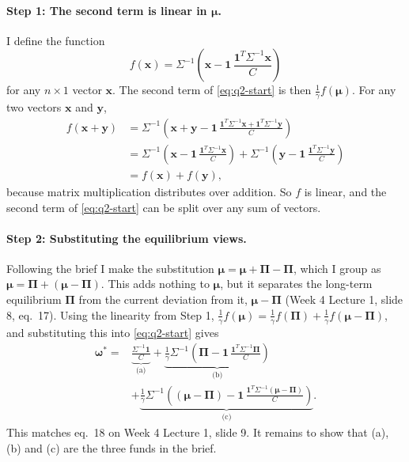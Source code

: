 \documentclass[11pt]{article}
\numberwithin{equation}{section}
\begin{document}
\paragraph{Step 1: The second term is linear in $\bm{\mu}$.}
I define the function
\begin{equation}
  f(\mathbf{x}) = \Sigma^{-1}\left(\mathbf{x} - \mathbf{1}\,\frac{\mathbf{1}^{T}\Sigma^{-1}\mathbf{x}}{C}\right)
  \label{eq:q2-f}
\end{equation}
for any $n \times 1$ vector $\mathbf{x}$. The second term of \eqref{eq:q2-start} is then $\frac{1}{\gamma} f(\bm{\mu})$. For any two vectors $\mathbf{x}$ and $\mathbf{y}$,
\begin{align*}
  f(\mathbf{x} + \mathbf{y})
  &= \Sigma^{-1}\left(\mathbf{x} + \mathbf{y} - \mathbf{1}\,\frac{\mathbf{1}^{T}\Sigma^{-1}\mathbf{x} + \mathbf{1}^{T}\Sigma^{-1}\mathbf{y}}{C}\right) \\
  &= \Sigma^{-1}\left(\mathbf{x} - \mathbf{1}\,\frac{\mathbf{1}^{T}\Sigma^{-1}\mathbf{x}}{C}\right) + \Sigma^{-1}\left(\mathbf{y} - \mathbf{1}\,\frac{\mathbf{1}^{T}\Sigma^{-1}\mathbf{y}}{C}\right) \\
  &= f(\mathbf{x}) + f(\mathbf{y}),
\end{align*}
because matrix multiplication distributes over addition. So $f$ is linear, and the second term of \eqref{eq:q2-start} can be split over any sum of vectors.

\paragraph{Step 2: Substituting the equilibrium views.}
Following the brief I make the substitution $\bm{\mu} = \bm{\mu} + \bm{\Pi} - \bm{\Pi}$, which I group as $\bm{\mu} = \bm{\Pi} + \left(\bm{\mu} - \bm{\Pi}\right)$. This adds nothing to $\bm{\mu}$, but it separates the long-term equilibrium $\bm{\Pi}$ from the current deviation from it, $\bm{\mu} - \bm{\Pi}$ (Week 4 Lecture 1, slide 8, eq.~17). Using the linearity from Step 1, $\frac{1}{\gamma} f(\bm{\mu}) = \frac{1}{\gamma} f(\bm{\Pi}) + \frac{1}{\gamma} f(\bm{\mu} - \bm{\Pi})$, and substituting this into \eqref{eq:q2-start} gives
\begin{equation}
  \begin{split}
  \bm{\omega}^{*}
  = {} & \underbrace{\frac{\Sigma^{-1}\mathbf{1}}{C}}_{\text{(a)}}
  + \underbrace{\frac{1}{\gamma}\Sigma^{-1}\left(\bm{\Pi} - \mathbf{1}\,\frac{\mathbf{1}^{T}\Sigma^{-1}\bm{\Pi}}{C}\right)}_{\text{(b)}} \\
  & + \underbrace{\frac{1}{\gamma}\Sigma^{-1}\left((\bm{\mu} - \bm{\Pi}) - \mathbf{1}\,\frac{\mathbf{1}^{T}\Sigma^{-1}(\bm{\mu} - \bm{\Pi})}{C}\right)}_{\text{(c)}}.
  \end{split}
  \label{eq:q2-three-terms}
\end{equation}
This matches eq.~18 on Week 4 Lecture 1, slide 9. It remains to show that (a), (b) and (c) are the three funds in the brief.
\end{document}
